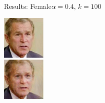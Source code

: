\documentclass[11pt]{beamer}
\begin{document}
\begin{frame}{Results: Female}{$\alpha=0.4$, $k=100$}
	\begin{minipage}{81px}
		\includegraphics[width=80px]{../pictures/outputs/start-imgs/Bush.png}\\
		\includegraphics[width=80px]{../pictures/outputs/female_alpha0.4_k100/Bush.png}
	\end{minipage}
\end{frame}

\end{document}
